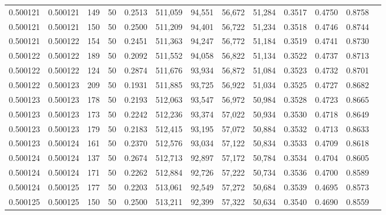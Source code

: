 \begin{tabular}{rrrrrrrrrrrrr}
0.500121 & 0.500121 &   149 &  50 &                                     0.2513 & 511,059 &  94,551 &  56,672 &  51,284 & 0.3517 & 0.4750 & 0.8758 \\
0.500121 & 0.500121 &   150 &  50 &                                     0.2500 & 511,209 &  94,401 &  56,722 &  51,234 & 0.3518 & 0.4746 & 0.8744 \\
0.500121 & 0.500122 &   154 &  50 &                                     0.2451 & 511,363 &  94,247 &  56,772 &  51,184 & 0.3519 & 0.4741 & 0.8730 \\
0.500122 & 0.500122 &   189 &  50 &                                     0.2092 & 511,552 &  94,058 &  56,822 &  51,134 & 0.3522 & 0.4737 & 0.8713 \\
0.500122 & 0.500122 &   124 &  50 &                                     0.2874 & 511,676 &  93,934 &  56,872 &  51,084 & 0.3523 & 0.4732 & 0.8701 \\
0.500122 & 0.500123 &   209 &  50 &                                     0.1931 & 511,885 &  93,725 &  56,922 &  51,034 & 0.3525 & 0.4727 & 0.8682 \\
0.500123 & 0.500123 &   178 &  50 &                                     0.2193 & 512,063 &  93,547 &  56,972 &  50,984 & 0.3528 & 0.4723 & 0.8665 \\
0.500123 & 0.500123 &   173 &  50 &                                     0.2242 & 512,236 &  93,374 &  57,022 &  50,934 & 0.3530 & 0.4718 & 0.8649 \\
0.500123 & 0.500123 &   179 &  50 &                                     0.2183 & 512,415 &  93,195 &  57,072 &  50,884 & 0.3532 & 0.4713 & 0.8633 \\
0.500123 & 0.500124 &   161 &  50 &                                     0.2370 & 512,576 &  93,034 &  57,122 &  50,834 & 0.3533 & 0.4709 & 0.8618 \\
0.500124 & 0.500124 &   137 &  50 &                                     0.2674 & 512,713 &  92,897 &  57,172 &  50,784 & 0.3534 & 0.4704 & 0.8605 \\
0.500124 & 0.500124 &   171 &  50 &                                     0.2262 & 512,884 &  92,726 &  57,222 &  50,734 & 0.3536 & 0.4700 & 0.8589 \\
0.500124 & 0.500125 &   177 &  50 &                                     0.2203 & 513,061 &  92,549 &  57,272 &  50,684 & 0.3539 & 0.4695 & 0.8573 \\
0.500125 & 0.500125 &   150 &  50 &                                     0.2500 & 513,211 &  92,399 &  57,322 &  50,634 & 0.3540 & 0.4690 & 0.8559 \\

\end{tabular}
